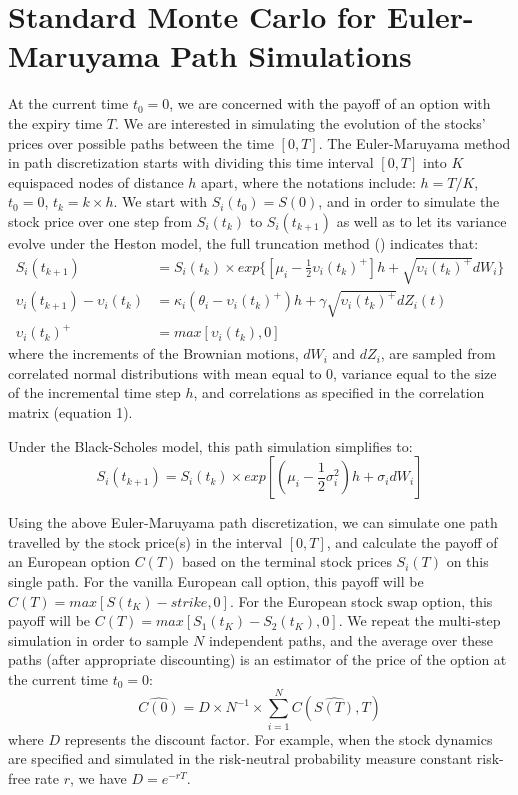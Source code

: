 \documentclass{article}
\begin{document}
\section{Standard Monte Carlo for Euler-Maruyama Path Simulations}
	At the current time $t_0=0$, we are concerned with the payoff of an option with the expiry time $T$. We are interested in simulating the evolution of the stocks' prices over possible paths between the time $[0,T]$. The Euler-Maruyama method in path discretization starts with dividing this time interval $[0,T]$ into $K$ equispaced nodes of distance $h$ apart, where the notations include: $h = T/K$, $t_0=0$, $t_k=k \times h$. We start with $S_i(t_0)=S(0)$, and in order to simulate the stock price over one step from $S_i(t_k)$ to $S_i(t_{k+1})$ as well as to let its variance evolve under the Heston model, the full truncation method (\cite{andersen07}) indicates that:
	\begin{align}
	S_i(t_{k+1}) &= S_i(t_k) \times exp\{[\mu_i - \frac{1}{2} \upsilon_i(t_k)^+] h + \sqrt{\upsilon_i(t_k)^+} dW_i \} \\
	\upsilon_i(t_{k+1}) - \upsilon_i(t_k) &= \kappa_i (\theta_i - \upsilon_i(t_k)^+) h + \gamma \sqrt{\upsilon_i(t_k)^+} dZ_i(t) \\
	\upsilon_i(t_k)^+ &= max[\upsilon_i(t_k), 0]
	\end{align}
	where the increments of the Brownian motions, $dW_i$ and $dZ_i$, are sampled from correlated normal distributions with mean equal to 0, variance equal to the size of the incremental time step $h$, and correlations as specified in the correlation matrix (equation 1). 
	
	Under the Black-Scholes model, this path simulation simplifies to:
	\begin{equation}
	S_i(t_{k+1}) = S_i(t_k) \times exp[(\mu_i - \frac{1}{2} \sigma_i^2) h + \sigma_i dW_i]
	\end{equation}
	
	Using the above Euler-Maruyama path discretization, we can simulate one path travelled by the stock price(s) in the interval $[0,T]$, and calculate the payoff of an European option $C(T)$ based on the terminal stock prices $S_i(T)$ on this single path. For the vanilla European call option, this payoff will be $C(T)=max[S(t_K)-strike,0]$. For the European stock swap option, this payoff will be $C(T)=max[S_1(t_K)-S_2(t_K),0]$. We repeat the multi-step simulation in order to sample $N$ independent paths, and the average over these paths (after appropriate discounting) is an estimator of the price of the option at the current time $t_0=0$:
    \begin{equation}
    \widehat{C(0)} = D \times N^{-1} \times \sum_{i=1}^N C(\widehat{S(T)},T)
    \end{equation}
	where $D$ represents the discount factor. For example, when the stock dynamics are specified and simulated in the risk-neutral probability measure constant risk-free rate $r$, we have $D=e^{-rT}$.
    
\end{document}
